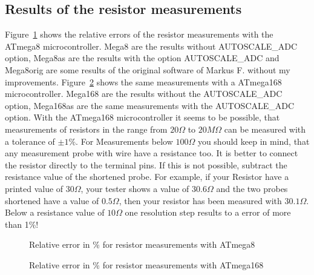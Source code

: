 \subsection{Results of the resistor measurements}
Figure~\ref{fig:mega8res} shows the relative errors of the resistor measurements with the
ATmega8 microcontroller. Mega8 are the results without AUTOSCALE\_ADC option,
Mega8as are the results with the option AUTOSCALE\_ADC and
Mega8orig are some results of the original software of Markus F. without my improvements.
Figure~\ref{fig:mega168res} shows the same measurements with a ATmega168 microcontroller.
Mega168 are the results without the AUTOSCALE\_ADC option, Mega168as are the same
measurements with the AUTOSCALE\_ADC option.
With the ATmega168 microcontroller it seems to be possible, that measurements of resistors
in the range from \(20\Omega\) to \(20M\Omega\) can be measured with a tolerance of \(\pm1\%\).
For Measurements below \(100\Omega\) you should keep in mind, that any measurement probe with
wire have a resistance too. It is better to connect the resistor directly to the terminal pins.
If this is not possible, subtract the resistance value of the shortened probe.
For example, if your Resistor have a printed value of \(30\Omega\), your tester shows a value of \(30.6\Omega\)
and the two probes shortened have a value of \(0.5\Omega\), then your resistor has been measured
with \(30.1\Omega\).
Below a resistance value of \(10\Omega\) one resolution step results to a error of more than 1\%!

\begin{figure}[H]
\centering

\caption{Relative error in \% for resistor measurements with ATmega8 }
\label{fig:mega8res}
\end{figure}

\begin{figure}[H]
\centering

\caption{Relative error in \% for resistor measurements with ATmega168 }
\label{fig:mega168res}
\end{figure}
